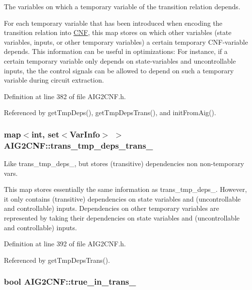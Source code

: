 The variables on which a temporary variable of the transition relation depends. 

For each temporary variable that has been introduced when encoding the transition relation into \hyperlink{classCNF}{C\-N\-F}, this map stores on which other variables (state variables, inputs, or other temporary variables) a certain temporary C\-N\-F-\/variable depends. This information can be useful in optimizations\-: For instance, if a certain temporary variable only depends on state-\/variables and uncontrollable inputs, the the control signals can be allowed to depend on such a temporary variable during circuit extraction. 

Definition at line 382 of file A\-I\-G2\-C\-N\-F.\-h.



Referenced by get\-Tmp\-Deps(), get\-Tmp\-Deps\-Trans(), and init\-From\-Aig().

\hypertarget{classAIG2CNF_a7e3c2e9acc3357e837349e30447b93c3}{
\subsubsection[{trans\-\_\-tmp\-\_\-deps\-\_\-trans\-\_\-}]{\setlength{\rightskip}{0pt plus 5cm}map$<$int, set$<${\bf Var\-Info}$>$ $>$ A\-I\-G2\-C\-N\-F\-::trans\-\_\-tmp\-\_\-deps\-\_\-trans\-\_\-\hspace{0.3cm}{\ttfamily [protected]}}}\label{classAIG2CNF_a7e3c2e9acc3357e837349e30447b93c3}


Like trans\-\_\-tmp\-\_\-deps\-\_\-, but stores (transitive) dependencies non non-\/temporary vars. 

This map stores essentially the same information as trans\-\_\-tmp\-\_\-deps\-\_\-. However, it only contains (transitive) dependencies on state variables and (uncontrollable and controllable) inputs. Dependencies on other temporary variables are represented by taking their dependencies on state variables and (uncontrollable and controllable) inputs. 

Definition at line 392 of file A\-I\-G2\-C\-N\-F.\-h.



Referenced by get\-Tmp\-Deps\-Trans().

\hypertarget{classAIG2CNF_a0a46853e81b9c2be9dc9dab2d080355d}{
\subsubsection[{true\-\_\-in\-\_\-trans\-\_\-}]{\setlength{\rightskip}{0pt plus 5cm}bool A\-I\-G2\-C\-N\-F\-::true\-\_\-in\-\_\-trans\-\_\-\hspace{0.3cm}{\ttfamily [protected]}}}\label{classAIG2CNF_a0a46853e81b9c2be9dc9dab2d080355d}


